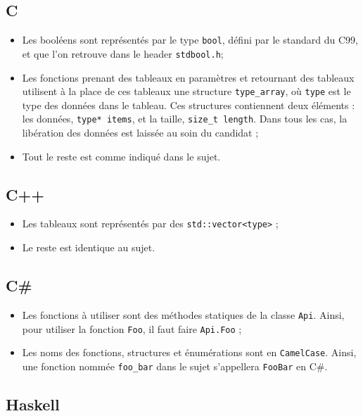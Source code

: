 \subsection{C}

\begin{itemize}
\item{Les booléens sont représentés par le type \texttt{bool}, défini par le
      standard du C99, et que l'on retrouve dans le header \texttt{stdbool.h};}
\item{Les fonctions prenant des tableaux en paramètres et retournant des
      tableaux utilisent à la place de ces tableaux une structure
      \texttt{type\_array}, où \texttt{type} est le type des données dans le
      tableau. Ces structures contiennent deux éléments : les données,
      \texttt{type* items}, et la taille, \texttt{size\_t length}. Dans tous les
      cas, la libération des données est laissée au soin du candidat ;}
\item{Tout le reste est comme indiqué dans le sujet.}
\end{itemize}

\subsection{C++}

\begin{itemize}
\item{Les tableaux sont représentés par des \texttt{std::vector<type>} ;}
\item{Le reste est identique au sujet.}
\end{itemize}

\subsection{C\#}

\begin{itemize}
\item{Les fonctions à utiliser sont des méthodes statiques de la classe
      \texttt{Api}.
      Ainsi, pour utiliser la fonction \texttt{Foo}, il faut faire
      \texttt{Api.Foo} ;}
\item{Les noms des fonctions, structures et énumérations sont en
      \texttt{CamelCase}. Ainsi, une fonction nommée \texttt{foo\_bar} dans
      le sujet s'appellera \texttt{FooBar} en C\#.}
\end{itemize}

\subsection{Haskell}

